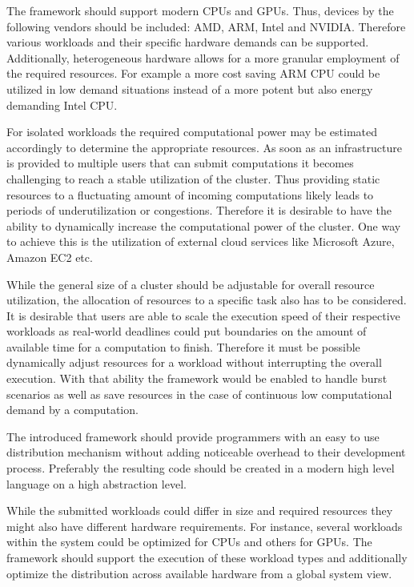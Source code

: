 \begin{description}[style=nextline]
    \item [Heterogeneity]
    The framework should support modern CPUs and GPUs. Thus, devices by the following vendors should be included: AMD, ARM, Intel and NVIDIA. Therefore various workloads and their specific hardware demands can be supported. Additionally, heterogeneous hardware allows for a more granular employment of the required resources. For example a more cost saving ARM CPU could be utilized in low demand situations instead of a more potent but also energy demanding Intel CPU.

    \item [Resource Scalability]
    For isolated workloads the required computational power may be estimated accordingly to determine the appropriate resources. As soon as an infrastructure is provided to multiple users that can submit computations it becomes challenging to reach a stable utilization of the cluster. Thus providing static resources to a fluctuating amount of incoming computations likely leads to periods of underutilization or congestions. Therefore it is desirable to have the ability to dynamically increase the computational power of the cluster. One way to achieve this is the utilization of external cloud services like Microsoft Azure, Amazon EC2 etc.

    \item [Scalable Speed]
    While the general size of a cluster should be adjustable for overall resource utilization, the allocation of resources to a specific task also has to be considered. It is desirable that users are able to scale the execution speed of their respective workloads as real-world deadlines could put boundaries on the amount of available time for a computation to finish. Therefore it must be possible dynamically adjust resources for a workload without interrupting the overall execution. With that ability the framework would be enabled to handle burst scenarios as well as save resources in the case of continuous low computational demand by a computation.

    \item [Ease of Programming]
    The introduced framework should provide programmers with an easy to use distribution mechanism without adding noticeable overhead to their development process. Preferably the resulting code should be created in a modern high level language on a high abstraction level.

    \item [Workload Diversity]
    While the submitted workloads could differ in size and required resources they might also have different hardware requirements. For instance, several workloads within the system could be optimized for CPUs and others for GPUs. The framework should support the execution of these workload types and additionally optimize the distribution across available hardware from a global system view.


\end{description}
